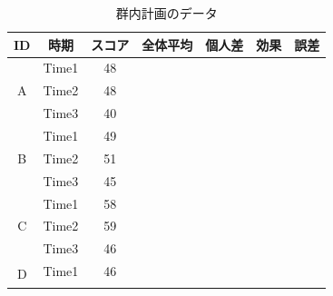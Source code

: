 \documentclass[a4paper,12pt]{ltjarticle}
\begin{document}
\begin{table}[ht]
	\centering
	\caption{群内計画のデータ}
	\small
	\begin{tabular}{|c|c|c|c|c|c|c|}
		\hline
		ID & 時期 & スコア & 全体平均 & 個人差 & 効果 & 誤差 \\ \hline
		\multirow{3}{*}{A} & Time1 & 48 & \multirow{15}{*}{\hspace{2cm}} & \multirow{3}{*}{\hspace{2cm}} & \hspace{2cm} & \hspace{2cm} \\ \cline{2-3}\cline{6-7}
		 & Time2 & 48 &  &  & \hspace{2cm} & \hspace{2cm} \\ \cline{2-3}\cline{6-7}
		 & Time3 & 40 &  &  & \hspace{2cm} & \hspace{2cm} \\ \hline
		\multirow{3}{*}{B} & Time1 & 49 &  & \multirow{3}{*}{\hspace{2cm}} & \hspace{2cm} & \hspace{2cm} \\ \cline{2-3}\cline{6-7}
		 & Time2 & 51 &  &  & \hspace{2cm} & \hspace{2cm} \\ \cline{2-3}\cline{6-7}
		 & Time3 & 45 &  &  & \hspace{2cm} & \hspace{2cm} \\ \hline
		\multirow{3}{*}{C} & Time1 & 58 &  & \multirow{3}{*}{\hspace{2cm}} & \hspace{2cm} & \hspace{2cm} \\ \cline{2-3}\cline{6-7}
		 & Time2 & 59 &  &  & \hspace{2cm} & \hspace{2cm} \\ \cline{2-3}\cline{6-7}
		 & Time3 & 46 &  &  & \hspace{2cm} & \hspace{2cm} \\ \hline
		\multirow{3}{*}{D} & Time1 & 46 &  & \multirow{3}{*}{\hspace{2cm}} & \hspace{2cm} & \hspace{2cm} \\ \cline{2-3}\cline{6-7}

\end{tabular}
\end{table}
\end{document}

